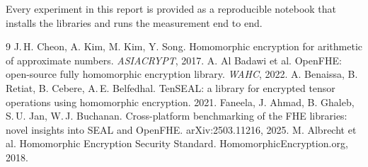 \documentclass[11pt,a4paper]{article}
\begin{document}
Every experiment in this report is provided as a reproducible notebook that installs the
libraries and runs the measurement end to end.

\begin{thebibliography}{9}\small
{} J.\,H. Cheon, A. Kim, M. Kim, Y. Song. Homomorphic encryption
for arithmetic of approximate numbers. \emph{ASIACRYPT}, 2017.
 A. Al Badawi et al. OpenFHE: open-source fully homomorphic
encryption library. \emph{WAHC}, 2022.
 A. Benaissa, B. Retiat, B. Cebere, A.\,E. Belfedhal.
TenSEAL: a library for encrypted tensor operations using homomorphic encryption.
2021.
 Faneela, J. Ahmad, B. Ghaleb, S.\,U. Jan, W.\,J. Buchanan.
Cross-platform benchmarking of the FHE libraries: novel insights into SEAL and
OpenFHE. arXiv:2503.11216, 2025.
 M. Albrecht et al. Homomorphic Encryption Security Standard.
HomomorphicEncryption.org, 2018.
\end{thebibliography}
\end{document}
